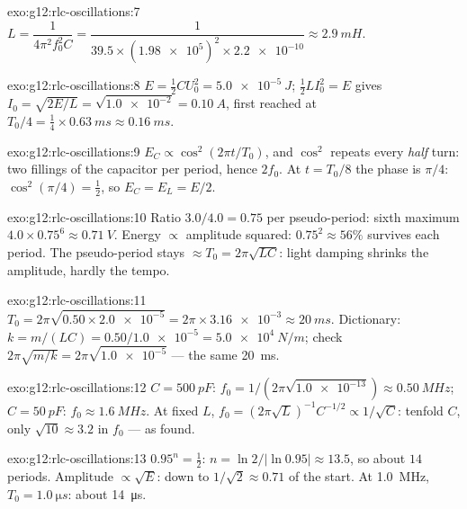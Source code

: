 \begin{solution}{exo:g12:rlc-oscillations:7}
$L = \dfrac{1}{4\pi^2 f_0^2 C} = \dfrac{1}{39.5 \times
(\num{1.98e5})^2 \times \num{2.2e-10}} \approx \qty{2.9}{mH}$.
\end{solution}

\begin{solution}{exo:g12:rlc-oscillations:8}
$E = \tfrac12 CU_0^2 = \qty{5.0e-5}{J}$; $\tfrac12 LI_0^2 = E$ gives
$I_0 = \sqrt{2E/L} = \sqrt{\num{1.0e-2}} = \qty{0.10}{A}$, first
reached at $T_0/4 = \tfrac14 \times \qty{0.63}{ms} \approx
\qty{0.16}{ms}$.
\end{solution}

\begin{solution}{exo:g12:rlc-oscillations:9}
$E_C \propto \cos^2(2\pi t/T_0)$, and $\cos^2$ repeats every
\emph{half} turn: two fillings of the capacitor per period, hence
$2f_0$. At $t = T_0/8$ the phase is $\pi/4$:
$\cos^2(\pi/4) = \tfrac12$, so $E_C = E_L = E/2$.
\end{solution}

\begin{solution}{exo:g12:rlc-oscillations:10}
Ratio $3.0/4.0 = 0.75$ per pseudo-period: sixth maximum
$4.0 \times 0.75^6 \approx \qty{0.71}{V}$. Energy $\propto$ amplitude
squared: $0.75^2 \approx 56\%$ survives each period. The
pseudo-period stays $\approx T_0 = 2\pi\sqrt{LC}$: light damping
shrinks the amplitude, hardly the tempo.
\end{solution}

\begin{solution}{exo:g12:rlc-oscillations:11}
$T_0 = 2\pi\sqrt{0.50 \times \num{2.0e-5}} = 2\pi \times
\num{3.16e-3} \approx \qty{20}{ms}$. Dictionary: $k = m/(LC) =
0.50/\num{1.0e-5} = \qty{5.0e4}{N/m}$; check
$2\pi\sqrt{m/k} = 2\pi\sqrt{\num{1.0e-5}}$ --- the same \qty{20}{ms}.
\end{solution}

\begin{solution}{exo:g12:rlc-oscillations:12}
$C = \qty{500}{pF}$: $f_0 = 1/(2\pi\sqrt{\num{1.0e-13}}) \approx
\qty{0.50}{MHz}$; $C = \qty{50}{pF}$: $f_0 \approx \qty{1.6}{MHz}$.
At fixed $L$, $f_0 = (2\pi\sqrt{L})^{-1} C^{-1/2} \propto 1/\sqrt{C}$:
tenfold $C$, only $\sqrt{10} \approx 3.2$ in $f_0$ --- as found.
\end{solution}

\begin{solution}{exo:g12:rlc-oscillations:13}
$0.95^n = \tfrac12$: $n = \ln 2/\lvert\ln 0.95\rvert \approx 13.5$,
so about $14$ periods. Amplitude $\propto \sqrt{E}$: down to
$1/\sqrt{2} \approx 0.71$ of the start. At \qty{1.0}{MHz},
$T_0 = \qty{1.0}{\micro s}$: about \qty{14}{\micro s}.
\end{solution}

